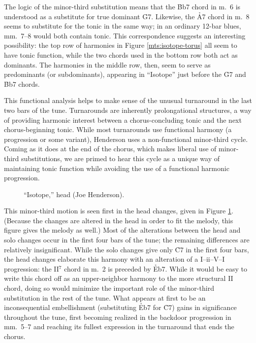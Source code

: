 The logic of the minor-third substitution means that the \h{Bb7} chord in m.~6
is understood as a substitute for true dominant \h{G7}. Likewise, the \h{A7}
chord in m.~8 seems to substitute for the tonic in the same way; in an
ordinary 12-bar blues, mm.~7--8 would both contain tonic. This correspondence
suggests an interesting possibility: the top row of harmonies in Figure
\ref{mts:isotope-torus} all seem to have tonic function, while the two chords
used in the bottom row both act as dominants. The harmonies in the middle row,
then, seem to serve as predominants (or subdominants), appearing in
``Isotope'' just before the \h{G7} and \h{Bb7} chords.

This functional analysis helps to make sense of the unusual turnaround in the
last two bars of the tune. Turnarounds are inherently prolongational
structures, a way of providing harmonic interest between a chorus-concluding
tonic and the next chorus-beginning tonic. While most turnarounds
use functional harmony (a \tfo progression or some variant), Henderson uses a
non-functional minor-third cycle. Coming as it does at the end of the chorus,
which makes liberal use of minor-third substitutions, we are primed to hear
this cycle as a unique way of maintaining tonic function while avoiding the use
of a functional harmonic progression.

\begin{figure}[tbp]
  \caption{``Isotope,'' head (Joe Henderson).}
  \label{mts:isotope-head}
\end{figure}

This minor-third motion is seen first in the head changes, given in Figure
\ref{mts:isotope-head}. (Because the changes are altered in the head in order
to fit the melody, this figure gives the melody as well.) Most of the
alterations between the head and solo changes occur in the first four bars of
the tune; the remaining differences are relatively insignificant.
While the solo changes give only \h{C7} in the first four bars, the head
changes elaborate this harmony with an alteration of a I--ii--V--I
progression: the II$^7$ chord in m.~2 is preceded by \h{Eb7}. While it would
be easy to write this chord off as an upper-neighbor harmony to the more
structural II chord, doing so would minimize the important role of the
minor-third substitution in the rest of the tune. What appears at first to be
an inconsequential embellishment (substituting \h{Eb7} for \h{C7}) gains in
significance throughout the tune, first becoming realized in the backdoor
progression in mm.~5--7 and reaching its fullest expression in the turnaround
that ends the chorus.

